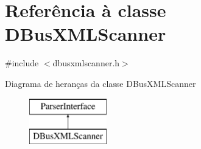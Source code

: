 \hypertarget{class_d_bus_x_m_l_scanner}{\section{Referência à classe D\-Bus\-X\-M\-L\-Scanner}
\label{class_d_bus_x_m_l_scanner}
}


{\ttfamily \#include $<$dbusxmlscanner.\-h$>$}

Diagrama de heranças da classe D\-Bus\-X\-M\-L\-Scanner\begin{figure}[H]
\begin{center}
\leavevmode
\includegraphics[height=2.000000cm]{class_d_bus_x_m_l_scanner}
\end{center}
\end{figure}

